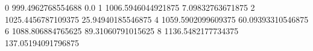 0 999.4962768554688 0.0
1 1006.5946044921875 7.09832763671875
2 1025.4456787109375 25.94940185546875
4 1059.5902099609375 60.09393310546875
6 1088.806884765625 89.31060791015625
8 1136.5482177734375 137.05194091796875
